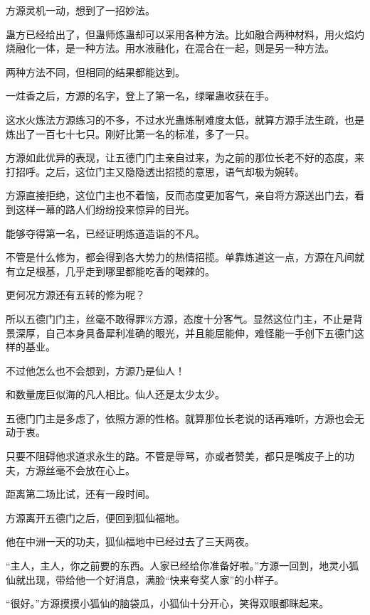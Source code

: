 
\begin{this_body}



方源灵机一动，想到了一招妙法。

蛊方已经给出了，但蛊师炼蛊却可以采用各种方法。比如融合两种材料，用火焰灼烧融化一体，是一种方法。用水液融化，在混合在一起，则是另一种方法。

两种方法不同，但相同的结果都能达到。

一炷香之后，方源的名字，登上了第一名，绿曜蛊收获在手。

这水火炼法方源练习的不多，不过水光蛊炼制难度太低，就算方源手法生疏，也是炼出了一百七十七只。刚好比第一名的标准，多了一只。

方源如此优异的表现，让五德门门主亲自过来，为之前的那位长老不好的态度，来打招呼。之后，这位门主又隐隐透出招揽的意思，语气却极为婉转。

方源直接拒绝，这位门主也不着恼，反而态度更加客气，亲自将方源送出门去，看到这样一幕的路人们纷纷投来惊异的目光。

能够夺得第一名，已经证明炼道造诣的不凡。

不管是什么修为，都会得到各大势力的热情招揽。单靠炼道这一点，方源在凡间就有立足根基，几乎走到哪里都能吃香的喝辣的。

更何况方源还有五转的修为呢？

所以五德门门主，丝毫不敢得罪\%方源，态度十分客气。显然这位门主，不止是背景深厚，自己本身具备犀利准确的眼光，并且能屈能伸，难怪能一手创下五德门这样的基业。

不过他怎么也不会想到，方源乃是仙人！

和数量庞巨似海的凡人相比。仙人还是太少太少。

五德门门主是多虑了，依照方源的性格。就算那位长老说的话再难听，方源也会无动于衷。

只要不阻碍他求道求永生的路。不管是辱骂，亦或者赞美，都只是嘴皮子上的功夫，方源丝毫不会放在心上。

距离第二场比试，还有一段时间。

方源离开五德门之后，便回到狐仙福地。

他在中洲一天的功夫，狐仙福地中已经过去了三天两夜。

“主人，主人，你之前要的东西。人家已经给你准备好啦。”方源一回到，地灵小狐仙就出现，带给他一个好消息，满脸“快来夸奖人家”的小样子。

“很好。”方源摸摸小狐仙的脑袋瓜，小狐仙十分开心，笑得双眼都眯起来。


\end{this_body}
